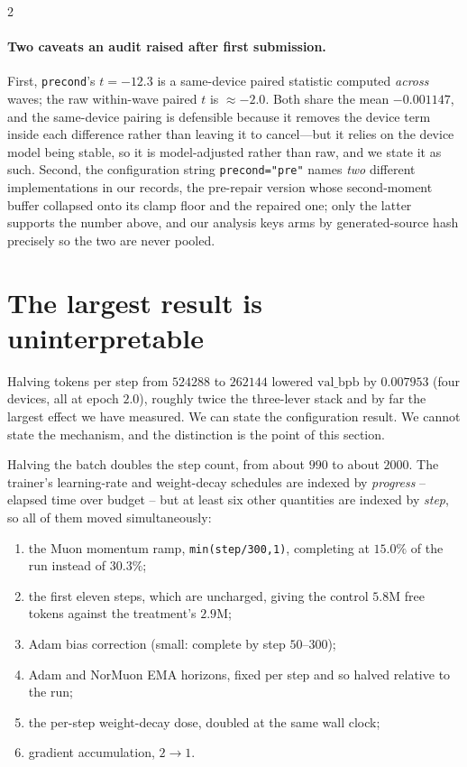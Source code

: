 \documentclass[10pt]{article}
\begin{document}
\begin{multicols}{2}
\paragraph{Two caveats an audit raised after first submission.} First, \texttt{precond}'s
$t=-12.3$ is a same-device paired statistic computed \emph{across} waves; the raw
within-wave paired $t$ is $\approx-2.0$. Both share the mean $-0.001147$, and the
same-device pairing is defensible because it removes the device term inside each
difference rather than leaving it to cancel---but it relies on the device model being
stable, so it is model-adjusted rather than raw, and we state it as such. Second, the
configuration string \texttt{precond="pre"} names \emph{two} different implementations in
our records, the pre-repair version whose second-moment buffer collapsed onto its clamp
floor and the repaired one; only the latter supports the number above, and our analysis
keys arms by generated-source hash precisely so the two are never pooled.

\section{The largest result is uninterpretable}
\label{sec:sixlegs}

Halving tokens per step from $524288$ to $262144$ lowered $\mathrm{val\_bpb}$ by
$0.007953$ (four devices, all at epoch $2.0$), roughly twice the three-lever stack and by
far the largest effect we have measured. We can state the configuration result. We cannot
state the mechanism, and the distinction is the point of this section.

Halving the batch doubles the step count, from about $990$ to about $2000$. The trainer's
learning-rate and weight-decay schedules are indexed by \emph{progress} -- elapsed time
over budget -- but at least six other quantities are indexed by \emph{step}, so all of
them moved simultaneously:

\begin{enumerate}\itemsep0pt
\item the Muon momentum ramp, \texttt{min(step/300,1)}, completing at $15.0\%$ of the run
      instead of $30.3\%$;
\item the first eleven steps, which are uncharged, giving the control $5.8$M free tokens
      against the treatment's $2.9$M;
\item Adam bias correction (small: complete by step $50$--$300$);
\item Adam and NorMuon EMA horizons, fixed per step and so halved relative to the run;
\item the per-step weight-decay dose, doubled at the same wall clock;
\item gradient accumulation, $2\to1$.
\end{enumerate}


\end{multicols}
\end{document}
